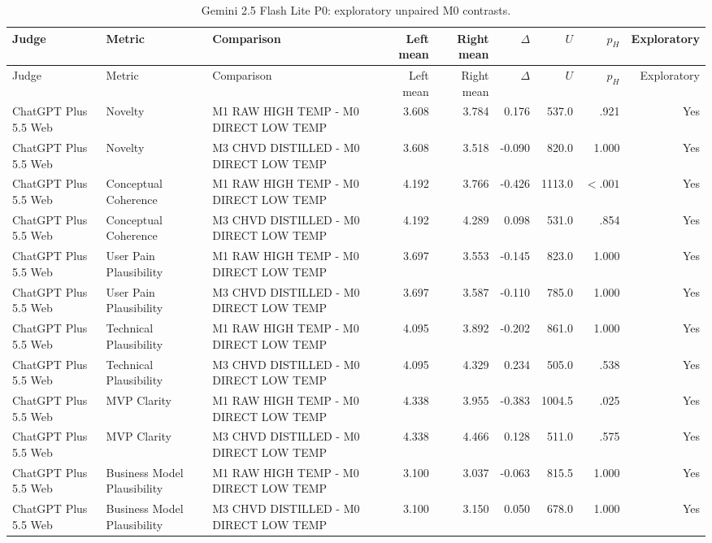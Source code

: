 \documentclass[10pt]{article}
\begin{document}
\begin{landscape}
\small
\begin{longtable}{lllrrrrrr}
\caption{Gemini 2.5 Flash Lite P0: exploratory unpaired M0 contrasts.}\label{tab:s17-m025p0}\\
\toprule Judge & Metric & Comparison & Left mean & Right mean & $\Delta$ & $U$ & $p_H$ & Exploratory \\ \midrule\endfirsthead
\toprule Judge & Metric & Comparison & Left mean & Right mean & $\Delta$ & $U$ & $p_H$ & Exploratory \\ \midrule\endhead
\bottomrule\endfoot
ChatGPT Plus 5.5 Web & Novelty & M1 RAW HIGH TEMP - M0 DIRECT LOW TEMP & 3.608 & 3.784 & 0.176 & 537.0 & .921 & Yes \\
ChatGPT Plus 5.5 Web & Novelty & M3 CHVD DISTILLED - M0 DIRECT LOW TEMP & 3.608 & 3.518 & -0.090 & 820.0 & 1.000 & Yes \\
ChatGPT Plus 5.5 Web & Conceptual Coherence & M1 RAW HIGH TEMP - M0 DIRECT LOW TEMP & 4.192 & 3.766 & -0.426 & 1113.0 & $<.001$ & Yes \\
ChatGPT Plus 5.5 Web & Conceptual Coherence & M3 CHVD DISTILLED - M0 DIRECT LOW TEMP & 4.192 & 4.289 & 0.098 & 531.0 & .854 & Yes \\
ChatGPT Plus 5.5 Web & User Pain Plausibility & M1 RAW HIGH TEMP - M0 DIRECT LOW TEMP & 3.697 & 3.553 & -0.145 & 823.0 & 1.000 & Yes \\
ChatGPT Plus 5.5 Web & User Pain Plausibility & M3 CHVD DISTILLED - M0 DIRECT LOW TEMP & 3.697 & 3.587 & -0.110 & 785.0 & 1.000 & Yes \\
ChatGPT Plus 5.5 Web & Technical Plausibility & M1 RAW HIGH TEMP - M0 DIRECT LOW TEMP & 4.095 & 3.892 & -0.202 & 861.0 & 1.000 & Yes \\
ChatGPT Plus 5.5 Web & Technical Plausibility & M3 CHVD DISTILLED - M0 DIRECT LOW TEMP & 4.095 & 4.329 & 0.234 & 505.0 & .538 & Yes \\
ChatGPT Plus 5.5 Web & MVP Clarity & M1 RAW HIGH TEMP - M0 DIRECT LOW TEMP & 4.338 & 3.955 & -0.383 & 1004.5 & .025 & Yes \\
ChatGPT Plus 5.5 Web & MVP Clarity & M3 CHVD DISTILLED - M0 DIRECT LOW TEMP & 4.338 & 4.466 & 0.128 & 511.0 & .575 & Yes \\
ChatGPT Plus 5.5 Web & Business Model Plausibility & M1 RAW HIGH TEMP - M0 DIRECT LOW TEMP & 3.100 & 3.037 & -0.063 & 815.5 & 1.000 & Yes \\
ChatGPT Plus 5.5 Web & Business Model Plausibility & M3 CHVD DISTILLED - M0 DIRECT LOW TEMP & 3.100 & 3.150 & 0.050 & 678.0 & 1.000 & Yes \\

\end{longtable}
\end{landscape}
\end{document}
